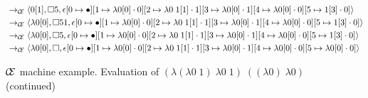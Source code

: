 \begin{sidewaysfigure}
\begin{align*}
&\rightarrow_{\mathcal{\mathcal{C} \mskip -4mu \mathcal{E}}}\langle 0[1],\square 5,\epsilon[0\mapsto\bullet][1\mapsto\lambda0[0]\cdot0][2\mapsto\lambda0\;1[1]\cdot1][3\mapsto\lambda0[0]\cdot1][4\mapsto\lambda0[0]\cdot0][5\mapsto1[3]\cdot0]\rangle\\ 
&\rightarrow_{\mathcal{\mathcal{C} \mskip -4mu \mathcal{E}}}\langle \lambda0[0],\square 5 1,\epsilon[0\mapsto\bullet][1\mapsto\lambda0[0]\cdot0][2\mapsto\lambda0\;1[1]\cdot1][3\mapsto\lambda0[0]\cdot1][4\mapsto\lambda0[0]\cdot0][5\mapsto1[3]\cdot0]\rangle\\ 
&\rightarrow_{\mathcal{\mathcal{C} \mskip -4mu \mathcal{E}}}\langle \lambda0[0],\square 5,\epsilon[0\mapsto\bullet][1\mapsto\lambda0[0]\cdot0][2\mapsto\lambda0\;1[1]\cdot1][3\mapsto\lambda0[0]\cdot1][4\mapsto\lambda0[0]\cdot0][5\mapsto1[3]\cdot0]\rangle\\ 
&\rightarrow_{\mathcal{\mathcal{C} \mskip -4mu \mathcal{E}}}\langle \lambda0[0],\square,\epsilon[0\mapsto\bullet][1\mapsto\lambda0[0]\cdot0][2\mapsto\lambda0\;1[1]\cdot1][3\mapsto\lambda0[0]\cdot1][4\mapsto\lambda0[0]\cdot0][5\mapsto\lambda0[0]\cdot0]\rangle
\end{align*}
\caption{$\mathcal{\mathcal{C} \mskip -4mu \mathcal{E}}$ machine example.
Evaluation of $(\lambda(\lambda0\;1)\;\lambda0\;1)\;((\lambda0)\;\lambda0)$
(continued)}
\label{fig:state}
\end{sidewaysfigure}

